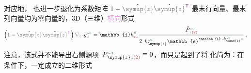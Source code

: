 对应地， 也进一步退化为系数矩阵 $1 - \hat{\mathcolor{gray}{\symup{z}}} \hat{\mathcolor{gray}{\symup{z}}}^{\mathsf{\textcolor{Plum}{T}}}$ 最末行向量、最末列向量均为零向量的，3D（三维）\textcolor{Plum}{横向}形式
\begin{align}  \label{eq:simplify6-V2'-SVA-V_1singular-nokxky-zeta}
	\left( 1 - \hat{\mathcolor{gray}{\symup{z}}} \hat{\mathcolor{gray}{\symup{z}}}^{\mathsf{\textcolor{Plum}{T}}} \right) \mathcolor{gray}{\nabla_z} \Xint{{}^{}_{\mathcolor{gray}{-}}}{10}{\bar{g}}^{\;\!\mathcolor{gray}{\omega} \textcolor{PineGreen}{\imath}}_{\;\! \mathcolor{gray}{z}} = \mathbb{i} k_{\textcolor{Maroon}{\mathsf{o}} \mathcolor{gray}{\omega}}^{\;\! 2} \frac{\Xint{\mathcolor{gray}{-}}{25}{\bar{P}}^{\;\! \mathcolor{gray}{\omega} \textcolor{PineGreen}{\imath}}_{\;\! \mathcolor{gray}{z} \textcolor{Maroon}{(2)}}}{2 \Xint{\begin{smallmatrix} ~ \\ {}^{}_{\mathcolor{gray}{-}} \\ ~ \end{smallmatrix}}{15}{k}_{\;\! \symup{z}}^{\;\! \mathcolor{gray}{\omega} \textcolor{PineGreen}{\imath}} \mathbb{e}^{\mathbb{i} \Xint{\begin{smallmatrix} ~ \\ {}^{}_{\mathcolor{gray}{-}} \\ ~ \end{smallmatrix}}{15}{k}_{\symup{z}}^{\;\! \mathcolor{gray}{\omega} \textcolor{PineGreen}{\imath}} \mathcolor{gray}{z}}} ~,
\end{align}
注意，该式并不能导出右侧源项 $\Xint{\mathcolor{gray}{-}}{24}{P}^{\;\! \mathcolor{gray}{\omega} \textcolor{PineGreen}{\imath}}_{\;\! \symup{z} \mathcolor{gray}{z} \textcolor{Maroon}{(2)}} \equiv 0$，而只是起到了将  化简为：在  条件下，一定成立的二维形式

